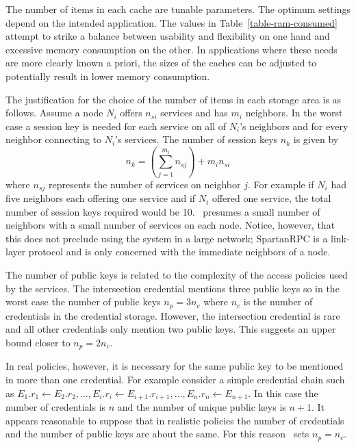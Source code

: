 The number of items in each cache are tunable parameters. The optimum settings depend on the
intended application. The values in Table~\ref{table-ram-consumed} attempt to strike a balance
between usability and flexibility on one hand and excessive memory consumption on the other. In
applications where these needs are more clearly known a priori, the sizes of the caches can be
adjusted to potentially result in lower memory consumption.


The justification for the choice of the number of items in each storage area is as follows.
Assume a node $N_i$ offers $n_{si}$ services and has $m_i$ neighbors. In the worst case a
session key is needed for each service on all of $N_i$'s neighbors and for every neighbor
connecting to $N_i$'s services. The number of session keys $n_k$ is given by
\begin{displaymath}
n_k = \left(\sum_{j = 1}^{m_i} n_{sj}\right) + m_i n_{si}
\end{displaymath}
where $n_{sj}$ represents the number of services on neighbor $j$. For example if $N_i$ had five
neighbors each offering one service and if $N_i$ offered one service, the total number of
session keys required would be 10. \Sprocket\ presumes a small number of neighbors with a small
number of services on each node. Notice, however, that this does not preclude using the system
in a large network; SpartanRPC is a link-layer protocol and is only concerned with the immediate
neighbors of a node.

The number of public keys is related to the complexity of the access policies used by the
services. The intersection credential mentions three public keys so in the worst case the number
of public keys $n_p = 3 n_c$ where $n_c$ is the number of credentials in the credential storage.
However, the intersection credential is rare and all other credentials only mention two public
keys. This suggests an upper bound closer to $n_p = 2 n_c$.

In real policies, however, it is necessary for the same public key to be mentioned in more than
one credential. For example consider a simple credential chain such as $E_1.r_1 \leftarrow
E_2.r_2, \ldots, E_i.r_i \leftarrow E_{i+1}.r_{i+1}, \ldots, E_n.r_n \leftarrow E_{n+1}$. In
this case the number of credentials is $n$ and the number of unique public keys is $n+1$. It
appears reasonable to suppose that in realistic policies the number of credentials and the
number of public keys are about the same. For this reason \Sprocket\ sets $n_p = n_c$.

